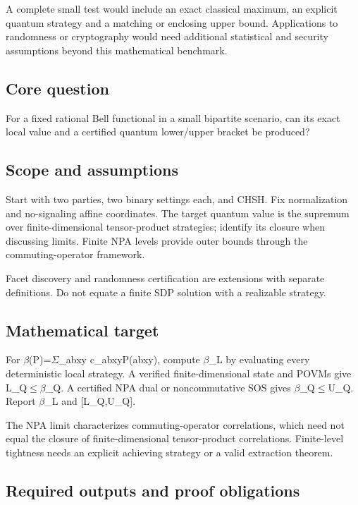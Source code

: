 \documentclass[
  11pt,
]{article}
\begin{document}
A complete small test would include an exact classical maximum, an
explicit quantum strategy and a matching or enclosing upper bound.
Applications to randomness or cryptography would need additional
statistical and security assumptions beyond this mathematical benchmark.

\subsection{Core question}

For a fixed rational Bell functional in a small bipartite scenario, can
its exact local value and a certified quantum lower/upper bracket be
produced?

\subsection{Scope and assumptions}

Start with two parties, two binary settings each, and CHSH. Fix
normalization and no-signaling affine coordinates. The target quantum
value is the supremum over finite-dimensional tensor-product strategies;
identify its closure when discussing limits. Finite NPA levels provide
outer bounds through the commuting-operator framework.

Facet discovery and randomness certification are extensions with
separate definitions. Do not equate a finite SDP solution with a
realizable strategy.

\subsection{Mathematical target}

For \ensuremath{\beta}(P)=\ensuremath{\Sigma}\_abxy
c\_abxyP(ab\textbar xy), compute \ensuremath{\beta}\_L by evaluating
every deterministic local strategy. A verified finite-dimensional state
and POVMs give L\_Q\ensuremath{\le}\ensuremath{\beta}\_Q. A certified
NPA dual or noncommutative SOS gives
\ensuremath{\beta}\_Q\ensuremath{\le}U\_Q. Report \ensuremath{\beta}\_L
and {[}L\_Q,U\_Q{]}.

The NPA limit characterizes commuting-operator correlations, which need
not equal the closure of finite-dimensional tensor-product correlations.
Finite-level tightness needs an explicit achieving strategy or a valid
extraction theorem.

\subsection{Required outputs and proof obligations}
\end{document}

